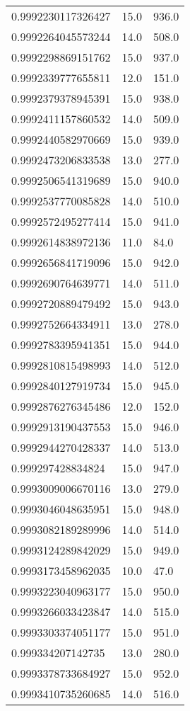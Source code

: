 \begin{center}
\begin{supertabular}[H]{p{0.30\textwidth}p{0.05\textwidth}p{0.05\textwidth}}
0.9992230117326427 & 15.0 & 936.0 \\ 
0.9992264045573244 & 14.0 & 508.0 \\ 
0.9992298869151762 & 15.0 & 937.0 \\ 
0.9992339777655811 & 12.0 & 151.0 \\ 
0.9992379378945391 & 15.0 & 938.0 \\ 
0.9992411157860532 & 14.0 & 509.0 \\ 
0.9992440582970669 & 15.0 & 939.0 \\ 
0.9992473206833538 & 13.0 & 277.0 \\ 
0.9992506541319689 & 15.0 & 940.0 \\ 
0.9992537770085828 & 14.0 & 510.0 \\ 
0.9992572495277414 & 15.0 & 941.0 \\ 
0.9992614838972136 & 11.0 & 84.0 \\ 
0.9992656841719096 & 15.0 & 942.0 \\ 
0.9992690764639771 & 14.0 & 511.0 \\ 
0.9992720889479492 & 15.0 & 943.0 \\ 
0.9992752664334911 & 13.0 & 278.0 \\ 
0.9992783395941351 & 15.0 & 944.0 \\ 
0.9992810815498993 & 14.0 & 512.0 \\ 
0.9992840127919734 & 15.0 & 945.0 \\ 
0.9992876276345486 & 12.0 & 152.0 \\ 
0.9992913190437553 & 15.0 & 946.0 \\ 
0.9992944270428337 & 14.0 & 513.0 \\ 
0.999297428834824 & 15.0 & 947.0 \\ 
0.9993009006670116 & 13.0 & 279.0 \\ 
0.9993046048635951 & 15.0 & 948.0 \\ 
0.9993082189289996 & 14.0 & 514.0 \\ 
0.9993124289842029 & 15.0 & 949.0 \\ 
0.9993173458962035 & 10.0 & 47.0 \\ 
0.9993223040963177 & 15.0 & 950.0 \\ 
0.9993266033423847 & 14.0 & 515.0 \\ 
0.9993303374051177 & 15.0 & 951.0 \\ 
0.999334207142735 & 13.0 & 280.0 \\ 
0.9993378733684927 & 15.0 & 952.0 \\ 
0.9993410735260685 & 14.0 & 516.0 \\ 

\end{supertabular}
\end{center}
